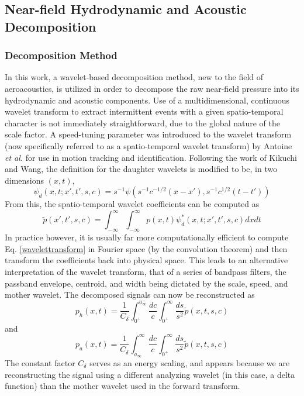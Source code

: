 \documentclass[english]{aiaa-tc}
\begin{document}
\subsection{Near-field Hydrodynamic and Acoustic Decomposition}\label{wavletdecomp}
\subsubsection{Decomposition Method}
In this work, a wavelet-based decomposition method, new to the field
of aeroacoustics, is utilized in order to decompose the raw near-field
pressure into its hydrodynamic and acoustic components. Use of a
multidimensional, continuous wavelet transform to extract intermittent
events with a given spatio-temporal character is not immediately
straightforward, due to the global nature of the scale factor. A
speed-tuning parameter was introduced to the wavelet transform (now
specifically referred to as a spatio-temporal wavelet transform) by
Antoine {\em et al.}\cite{Antoine2004} for use in motion tracking and
identification. Following the work of Kikuchi and
Wang\cite{Kikuchi2010}, the definition for the daughter wavelets is
modified to be, in two dimensions $(x,t)$,  
\begin{equation}
\psi_{d}(x,t;x',t',s,c)=s^{-1}\psi \left( s^{-1}c^{-1/2}(x-x'),s^{-1}c^{1/2}(t-t') \right)
\end{equation}
From this, the spatio-temporal wavelet coefficients can be computed as
\begin{equation}\label{wavelettransform}
\tilde{p}(x',t',s,c)=\int_{-\infty}^{\infty}\int_{-\infty}^{\infty}p(x,t)\psi^{*}_{d}(x,t;x',t',s,c)dxdt 
\end{equation}
In practice however, it is usually far more computationally efficient
to compute Eq. \ref{wavelettransform} in Fourier space (by the
convolution theorem) and then transform the coefficients back into
physical space. This leads to an alternative interpretation of the
wavelet transform, that of a series of bandpass filters, the passband
envelope, centroid, and width being dictated by the scale, speed, and
mother wavelet\cite{Torrence1998,Farge1992,Antoine2004}. The
decomposed signals can now be reconstructed as 
\begin{equation}
p_{h}(x,t) = \frac{1}{C_{\delta}}\int_{0^{+}}^{a_{\infty}^{-}}\frac{dc}{c}\int_{0^{+}}^{\infty}\frac{ds}{s^{2}}\tilde{p}(x,t,s,c)
\end{equation}
and
\begin{equation}
p_{a}(x,t) = \frac{1}{C_{\delta}}\int_{a_{\infty}}^{\infty}\frac{dc}{c}\int_{0^{+}}^{\infty}\frac{ds}{s^{2}}\tilde{p}(x,t,s,c)
\end{equation}
The constant factor $C_{\delta}$ serves as an energy scaling, and
appears because we are reconstructing the signal using a different
analyzing wavelet (in this case, a delta function) than the mother
wavelet used in the forward transform\cite{Torrence1998,Farge1992}. 
 
\end{document}
